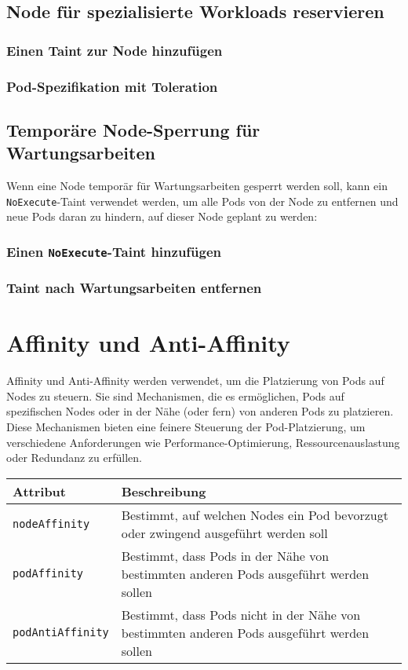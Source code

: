 \subsection{Node für spezialisierte Workloads reservieren}

\subsubsection{Einen Taint zur Node hinzufügen}


\subsubsection{Pod-Spezifikation mit Toleration}


\subsection{Temporäre Node-Sperrung für Wartungsarbeiten}
Wenn eine Node temporär für Wartungsarbeiten gesperrt werden soll, kann ein \texttt{NoExecute}-Taint verwendet werden, um alle Pods von der Node zu entfernen und neue Pods daran zu hindern, auf dieser Node geplant zu werden:

\subsubsection{Einen \texttt{NoExecute}-Taint hinzufügen}


\subsubsection{Taint nach Wartungsarbeiten entfernen}

\newpage
\section{Affinity und Anti-Affinity}
Affinity und Anti-Affinity werden verwendet, um die Platzierung von Pods auf Nodes zu steuern. Sie sind Mechanismen, die es ermöglichen, Pods auf spezifischen Nodes oder in der Nähe (oder fern) von anderen Pods zu platzieren. Diese Mechanismen bieten eine feinere Steuerung der Pod-Platzierung, um verschiedene Anforderungen wie Performance-Optimierung, Ressourcenauslastung oder Redundanz zu erfüllen.\\

\noindent
\begin{tabular}{|p{}|p{}|}
\hline
\textbf{Attribut} & \textbf{Beschreibung} \\
\hline
\texttt{nodeAffinity} & Bestimmt, auf welchen Nodes ein Pod bevorzugt oder zwingend ausgeführt werden soll \\
\texttt{podAffinity} & Bestimmt, dass Pods in der Nähe von bestimmten anderen Pods ausgeführt werden sollen \\
\texttt{podAntiAffinity} & Bestimmt, dass Pods nicht in der Nähe von bestimmten anderen Pods ausgeführt werden sollen \\
\hline
\end{tabular}
